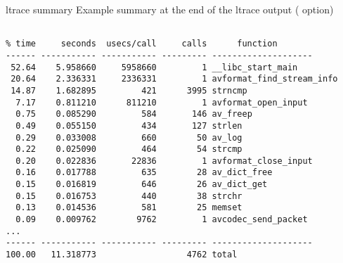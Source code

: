 \begin{frame}[fragile]{ltrace summary}
  Example summary at the end of the ltrace output ( option)
  \scriptsize
  \begin{block}{}
\begin{verbatim}

% time     seconds  usecs/call     calls      function
------ ----------- ----------- --------- --------------------
 52.64    5.958660     5958660         1 __libc_start_main
 20.64    2.336331     2336331         1 avformat_find_stream_info
 14.87    1.682895         421      3995 strncmp
  7.17    0.811210      811210         1 avformat_open_input
  0.75    0.085290         584       146 av_freep
  0.49    0.055150         434       127 strlen
  0.29    0.033008         660        50 av_log
  0.22    0.025090         464        54 strcmp
  0.20    0.022836       22836         1 avformat_close_input
  0.16    0.017788         635        28 av_dict_free
  0.15    0.016819         646        26 av_dict_get
  0.15    0.016753         440        38 strchr
  0.13    0.014536         581        25 memset
  0.09    0.009762        9762         1 avcodec_send_packet
...
------ ----------- ----------- --------- --------------------
100.00   11.318773                  4762 total
\end{verbatim}
  \end{block}
\end{frame}
